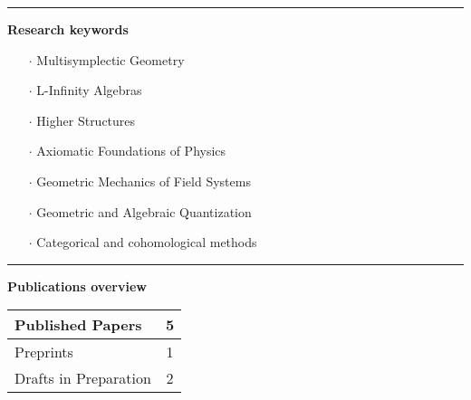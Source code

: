\documentclass[a4paper]{article}
\newcommand{\block}[1]{\hrule \vspace{0.2cm} \textbf{\Large #1} \vspace{0.2cm}}
\begin{document}
\hfill
\begin{minipage}[t]{0.375\columnwidth}


    \block{Research keywords}
    
    \begin{itemize}[leftmargin=*, itemsep=0pt, parsep=0pt, topsep=0pt, partopsep=0pt]
    
    \item[$\cdot$] Multisymplectic Geometry
    
    \item[$\cdot$] L-Infinity Algebras
    
    \item[$\cdot$] Higher Structures
    
    \item[$\cdot$] Axiomatic Foundations of Physics
    
    \item[$\cdot$] Geometric Mechanics of Field Systems
    
    \item[$\cdot$] Geometric and Algebraic Quantization
    
    \item[$\cdot$] Categorical and cohomological methods
    
    \end{itemize}
    \vspace{1em}





    \block{Publications overview} 
    
    \begin{tabularx}{\linewidth}{|X|c|}
    \hline
    
    Published Papers & 5 \\
    \hline
    
    Preprints & 1 \\
    \hline
    
    Drafts in Preparation & 2 \\
    \hline
    

\end{tabularx}
\end{minipage}
\end{document}
